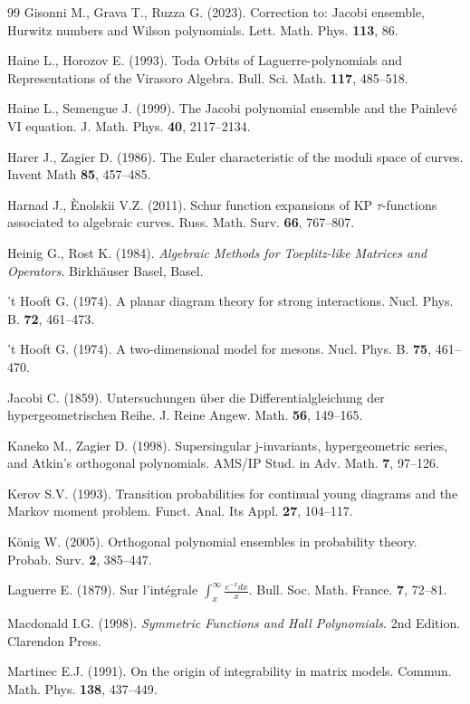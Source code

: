\documentclass[a4paper]{article}
\theoremstyle{plain}
\theoremstyle{definition}
\begin{document}
\begin{thebibliography}{99}
Gisonni M., Grava T., Ruzza G. (2023). Correction to: Jacobi ensemble, Hurwitz numbers and Wilson polynomials. Lett. Math. Phys. {\bf 113}, 86.

Haine L., Horozov E. (1993). Toda Orbits of Laguerre-polynomials and Representations of the Virasoro Algebra. Bull. Sci. Math. {\bf 117}, 485--518.

Haine L., Semengue J. (1999). The Jacobi polynomial ensemble and the Painlev\'e VI equation. J. Math. Phys. {\bf 40}, 2117--2134.

Harer J., Zagier D. (1986). The Euler characteristic of the moduli space of curves. Invent Math {\bf 85}, 457--485.

Harnad J., \`Enolskii V.Z. (2011). Schur function expansions of KP $\tau$-functions associated to algebraic curves. Russ. Math. Surv. {\bf 66}, 767--807.

Heinig G., Rost K. (1984). {\it Algebraic Methods for Toeplitz-like Matrices and Operators}. Birkh\"auser Basel, Basel.

't Hooft G. (1974). A planar diagram theory for strong interactions. Nucl. Phys. B. {\bf 72}, 461--473.

't Hooft G. (1974). A two-dimensional model for mesons. Nucl. Phys. B. {\bf 75}, 461--470.

Jacobi C. (1859). Untersuchungen \"uber die Differentialgleichung der hypergeometrischen Reihe. J. Reine Angew. Math. {\bf 56}, 149--165.

Kaneko M., Zagier D. (1998). Supersingular j-invariants, hypergeometric series, and Atkin's orthogonal polynomials. AMS/IP Stud. in Adv. Math. {\bf 7}, 97--126.

Kerov S.V. (1993). Transition probabilities for continual young diagrams and the Markov moment problem. Funct. Anal. Its Appl. {\bf 27}, 104--117.

K\"onig W. (2005). Orthogonal polynomial ensembles in probability theory. Probab. Surv. {\bf 2}, 385--447.

Laguerre E. (1879). Sur l'int\'egrale $\int_x^{\infty}\frac{e^{-x}dx}{x}$. Bull. Soc. Math. France. {\bf 7}, 72--81.

Macdonald I.G. (1998). {\it Symmetric Functions and Hall Polynomials}. 2nd Edition. Clarendon Press.

Martinec E.J. (1991). On the origin of integrability in matrix models. Commun. Math. Phys. {\bf 138}, 437--449.


\end{thebibliography}
\end{document}
